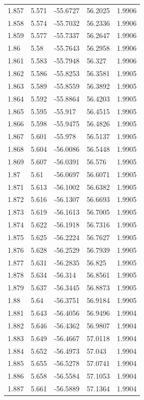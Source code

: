 \begin{tabular}{lllll}
1.857 & 5.571 & -55.6727 & 56.2025 & 1.9906 \\
1.858 & 5.574 & -55.7032 & 56.2336 & 1.9906 \\
1.859 & 5.577 & -55.7337 & 56.2647 & 1.9906 \\
1.86 & 5.58 & -55.7643 & 56.2958 & 1.9906 \\
1.861 & 5.583 & -55.7948 & 56.327 & 1.9906 \\
1.862 & 5.586 & -55.8253 & 56.3581 & 1.9905 \\
1.863 & 5.589 & -55.8559 & 56.3892 & 1.9905 \\
1.864 & 5.592 & -55.8864 & 56.4203 & 1.9905 \\
1.865 & 5.595 & -55.917 & 56.4515 & 1.9905 \\
1.866 & 5.598 & -55.9475 & 56.4826 & 1.9905 \\
1.867 & 5.601 & -55.978 & 56.5137 & 1.9905 \\
1.868 & 5.604 & -56.0086 & 56.5448 & 1.9905 \\
1.869 & 5.607 & -56.0391 & 56.576 & 1.9905 \\
1.87 & 5.61 & -56.0697 & 56.6071 & 1.9905 \\
1.871 & 5.613 & -56.1002 & 56.6382 & 1.9905 \\
1.872 & 5.616 & -56.1307 & 56.6693 & 1.9905 \\
1.873 & 5.619 & -56.1613 & 56.7005 & 1.9905 \\
1.874 & 5.622 & -56.1918 & 56.7316 & 1.9905 \\
1.875 & 5.625 & -56.2224 & 56.7627 & 1.9905 \\
1.876 & 5.628 & -56.2529 & 56.7939 & 1.9905 \\
1.877 & 5.631 & -56.2835 & 56.825 & 1.9905 \\
1.878 & 5.634 & -56.314 & 56.8561 & 1.9905 \\
1.879 & 5.637 & -56.3445 & 56.8873 & 1.9905 \\
1.88 & 5.64 & -56.3751 & 56.9184 & 1.9905 \\
1.881 & 5.643 & -56.4056 & 56.9496 & 1.9904 \\
1.882 & 5.646 & -56.4362 & 56.9807 & 1.9904 \\
1.883 & 5.649 & -56.4667 & 57.0118 & 1.9904 \\
1.884 & 5.652 & -56.4973 & 57.043 & 1.9904 \\
1.885 & 5.655 & -56.5278 & 57.0741 & 1.9904 \\
1.886 & 5.658 & -56.5584 & 57.1053 & 1.9904 \\
1.887 & 5.661 & -56.5889 & 57.1364 & 1.9904 \\

\end{tabular}
